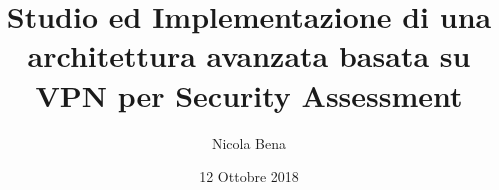 \documentclass{beamer}
\title[]{Studio ed Implementazione di una architettura avanzata basata su VPN per Security Assessment}
\author{Nicola Bena}
\date{12 Ottobre 2018}
\begin{document}
\frame{\titlepage}


\end{document}
